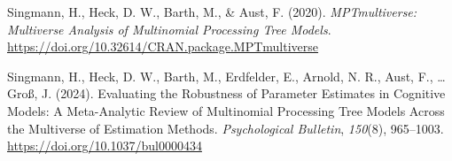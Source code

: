 \documentclass[
  doc,floatsintext]{apa6}
\newlength{\cslhangindent}
\newlength{\cslentryspacingunit} %
\newenvironment{CSLReferences}[2] %
 {%
  \setlength{\parindent}{0pt}
  \ifodd #1
  \let\oldpar\par
  \def\par{\hangindent=\cslhangindent\oldpar}
  \fi
  \setlength{\parskip}{#2\cslentryspacingunit}
 }%
 {}
\begin{document}
\begin{CSLReferences}{1}{0}
\leavevmode{}%
Singmann, H., Heck, D. W., Barth, M., \& Aust, F. (2020). \emph{{MPTmultiverse}: {Multiverse Analysis} of {Multinomial Processing Tree Models}}. \url{https://doi.org/10.32614/CRAN.package.MPTmultiverse}

\leavevmode{}%
Singmann, H., Heck, D. W., Barth, M., Erdfelder, E., Arnold, N. R., Aust, F., \ldots{} Groß, J. (2024). Evaluating the {Robustness} of {Parameter Estimates} in {Cognitive Models}: {A Meta-Analytic Review} of {Multinomial Processing Tree Models Across} the {Multiverse} of {Estimation Methods}. \emph{Psychological Bulletin}, \emph{150}(8), 965--1003. \url{https://doi.org/10.1037/bul0000434}

\end{CSLReferences}
\end{document}
